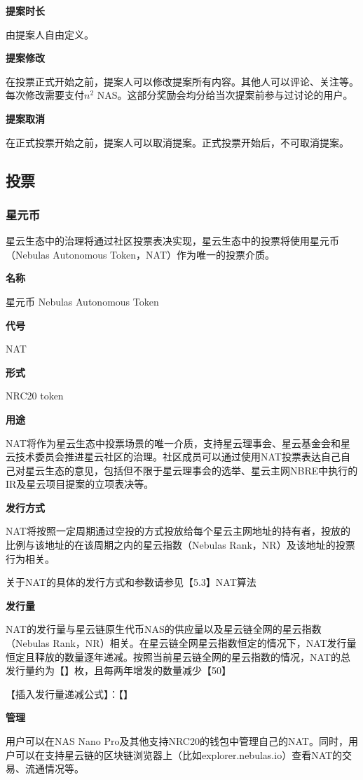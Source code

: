 \textbf{提案时长}

由提案人自由定义。

\textbf{提案修改}

在投票正式开始之前，提案人可以修改提案所有内容。其他人可以评论、关注等。每次修改需要支付$n^2$ NAS。这部分奖励会均分给当次提案前参与过讨论的用户。

\textbf{提案取消}

在正式投票开始之前，提案人可以取消提案。正式投票开始后，不可取消提案。

\subsection{投票}
\subsubsection{星元币}
星云生态中的治理将通过社区投票表决实现，星云生态中的投票将使用星元币（Nebulas Autonomous Token，NAT）作为唯一的投票介质。

\textbf{名称}
 
星元币 Nebulas Autonomous Token

\textbf{代号}

NAT

\textbf{形式}

NRC20 token

\textbf{用途}

NAT将作为星云生态中投票场景的唯一介质，支持星云理事会、星云基金会和星云技术委员会推进星云社区的治理。社区成员可以通过使用NAT投票表达自己自己对星云生态的意见，包括但不限于星云理事会的选举、星云主网NBRE中执行的IR及星云项目提案的立项表决等。

\textbf{发行方式}

NAT将按照一定周期通过空投的方式投放给每个星云主网地址的持有者，投放的比例与该地址的在该周期之内的星云指数（Nebulas Rank，NR）及该地址的投票行为相关。

关于NAT的具体的发行方式和参数请参见【5.3】NAT算法

\textbf{发行量}
	
NAT的发行量与星云链原生代币NAS的供应量以及星云链全网的星云指数（Nebulas Rank，NR）相关。在星云链全网星云指数恒定的情况下，NAT发行量恒定且释放的数量逐年递减。按照当前星云链全网的星云指数的情况，NAT的总发行量约为【】枚，且每两年增发的数量减少【50】%

【插入发行量递减公式】：【】

\textbf{管理}

用户可以在NAS Nano Pro及其他支持NRC20的钱包中管理自己的NAT。同时，用户可以在支持星云链的区块链浏览器上（比如explorer.nebulas.io）查看NAT的交易、流通情况等。

